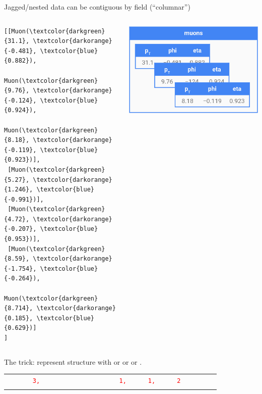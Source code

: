 \documentclass[aspectratio=169]{beamer}
\begin{document}
\begin{frame}[fragile]{Jagged/nested data can be contiguous by field (``columnar'')}
\vspace{0.5 cm}
\begin{columns}
\small
\begin{Verbatim}[commandchars=\\\{\}]
[[Muon(\textcolor{darkgreen}{31.1}, \textcolor{darkorange}{-0.481}, \textcolor{blue}{0.882}),
      Muon(\textcolor{darkgreen}{9.76}, \textcolor{darkorange}{-0.124}, \textcolor{blue}{0.924}),
      Muon(\textcolor{darkgreen}{8.18}, \textcolor{darkorange}{-0.119}, \textcolor{blue}{0.923})],
 [Muon(\textcolor{darkgreen}{5.27}, \textcolor{darkorange}{1.246}, \textcolor{blue}{-0.991})],
 [Muon(\textcolor{darkgreen}{4.72}, \textcolor{darkorange}{-0.207}, \textcolor{blue}{0.953})],
 [Muon(\textcolor{darkgreen}{8.59}, \textcolor{darkorange}{-1.754}, \textcolor{blue}{-0.264}),
      Muon(\textcolor{darkgreen}{8.714}, \textcolor{darkorange}{0.185}, \textcolor{blue}{0.629})]
]
\end{Verbatim}
\includegraphics[width=\linewidth]{muons-as-objects.png}
\end{columns}
\vspace{0.5 cm}
\large The trick: represent structure with  or  or  or .
\vspace{0.25 cm}
\begin{tabular}{r l}
\only<1>{\small \textcolor{red}{counts}  & \textcolor{red}{\tt\scriptsize \ \ \ \ \ 3,\ \ \ \ \ \ \ \ \ \ \ \ \ \ \ \ \ \ \ \ \ \ 1,\ \ \ \ \ \ 1,\ \ \ \ \ \ 2\ \ \ \ \ \ \ \ \ } \\}

\end{tabular}
\end{frame}
\end{document}
